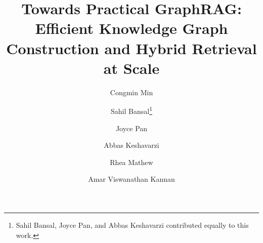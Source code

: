 \documentclass[runningheads]{llncs}
\begin{document}
%
\title{Towards Practical GraphRAG: Efficient Knowledge Graph Construction and Hybrid Retrieval at Scale}
%
%
\author{
Congmin Min \and
Sahil Bansal\thanks{Sahil Bansal, Joyce Pan, and Abbas Keshavarzi contributed equally to this work.} \and
Joyce Pan \and
Abbas Keshavarzi \and
Rhea Mathew \and
Amar Viswanathan Kannan
}






\end{document}

